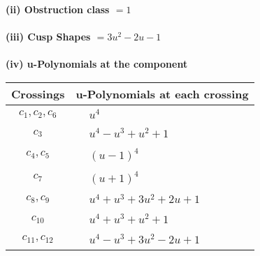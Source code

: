 \documentclass[1p]{elsarticle_modified}
\theoremstyle{definition}
\begin{document}
\flushleft \textbf{(ii) Obstruction class $= 1$}\\~\\
\flushleft \textbf{(iii) Cusp Shapes $= 3 u^2-2 u-1$}\\~\\
\newpage\renewcommand{\arraystretch}{1}
\flushleft \textbf{(iv) u-Polynomials at the component}\newline \\
\begin{tabular}{m{50pt}|m{274pt}}
Crossings & \hspace{64pt}u-Polynomials at each crossing \\
\hline $$\begin{aligned}c_{1},c_{2},c_{6}\end{aligned}$$&$\begin{aligned}
&u^4
\end{aligned}$\\
\hline $$\begin{aligned}c_{3}\end{aligned}$$&$\begin{aligned}
&u^4- u^3+u^2+1
\end{aligned}$\\
\hline $$\begin{aligned}c_{4},c_{5}\end{aligned}$$&$\begin{aligned}
&(u-1)^4
\end{aligned}$\\
\hline $$\begin{aligned}c_{7}\end{aligned}$$&$\begin{aligned}
&(u+1)^4
\end{aligned}$\\
\hline $$\begin{aligned}c_{8},c_{9}\end{aligned}$$&$\begin{aligned}
&u^4+u^3+3 u^2+2 u+1
\end{aligned}$\\
\hline $$\begin{aligned}c_{10}\end{aligned}$$&$\begin{aligned}
&u^4+u^3+u^2+1
\end{aligned}$\\
\hline $$\begin{aligned}c_{11},c_{12}\end{aligned}$$&$\begin{aligned}
&u^4- u^3+3 u^2-2 u+1
\end{aligned}$\\
\hline
\end{tabular}\\~\\
\end{document}
